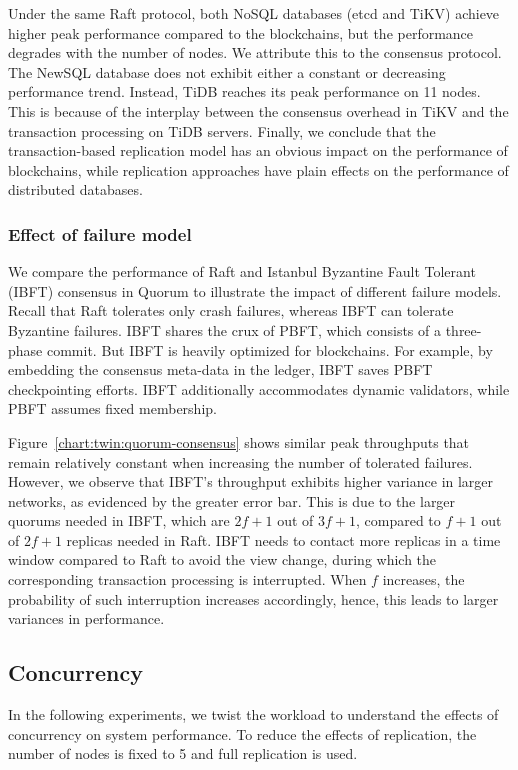 Under the same Raft protocol, both NoSQL databases (etcd and TiKV) achieve
higher peak performance compared to the blockchains, but the performance
degrades with the number of nodes.
We attribute this to the consensus protocol.
The NewSQL database does not exhibit either a constant or decreasing performance
trend.
Instead, TiDB reaches its peak performance on 11 nodes.
This is because of the interplay between the consensus overhead in TiKV and the
transaction processing on TiDB servers.
Finally, we conclude that the transaction-based replication model has an obvious
impact on the performance of blockchains, while replication approaches have plain
effects on the performance of distributed databases.

\subsubsection{Effect of failure model}
\label{sec:twin:exp:replication:consensus}
We compare the performance of Raft and Istanbul Byzantine Fault Tolerant (IBFT)
consensus in Quorum to illustrate the impact of different failure models.
Recall that Raft tolerates only crash failures, whereas IBFT can tolerate
Byzantine failures.
IBFT shares the crux of PBFT, which consists of a three-phase commit.
But IBFT is heavily optimized for blockchains.
For example, by embedding the consensus meta-data in the ledger, IBFT saves PBFT
checkpointing efforts.
IBFT additionally accommodates dynamic validators, while PBFT assumes fixed
membership.


Figure~\ref{chart:twin:quorum-consensus} shows similar peak throughputs that remain
relatively constant when increasing the number of tolerated failures.
However, we observe that IBFT's throughput exhibits higher variance in larger
networks, as evidenced by the greater error bar. This is due to the larger
quorums needed in IBFT, which are $2f+1$ out of $3f+1$, compared to $f+1$ out of
$2f+1$ replicas needed in Raft.
IBFT needs to contact more replicas in a time window compared to Raft to avoid
the view change, during which the corresponding transaction processing is
interrupted.
When $f$ increases, the probability of such interruption increases accordingly,
hence, this leads to larger variances in performance.

\subsection{Concurrency} 
\label{sec:twin:exp:concurrency}
In the following experiments, we twist the workload to understand the effects of
concurrency on system performance.
To reduce the effects of replication, the number of nodes is fixed to 5 and full
replication is used.

